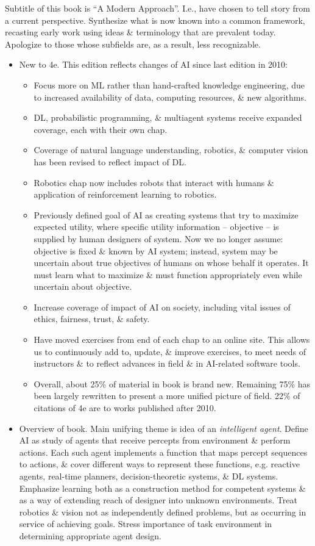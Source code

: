 \documentclass{article}
\begin{document}
\begin{itemize}
	Subtitle of this book is ``A Modern Approach''. I.e., have chosen to tell story from a current perspective. Synthesize what is now known into a common framework, recasting early work using ideas \& terminology that are prevalent today. Apologize to those whose subfields are, as a result, less recognizable.
	\begin{itemize}
		\item {\sf New to 4e.} This edition reflects changes of AI since last edition in 2010:
		\begin{itemize}
			\item Focus more on ML rather than hand-crafted knowledge engineering, due to increased availability of data, computing resources, \& new algorithms.
			\item DL, probabilistic programming, \& multiagent systems receive expanded coverage, each with their own chap.
			\item Coverage of natural language understanding, robotics, \& computer vision has been revised to reflect impact of DL.
			\item Robotics chap now includes robots that interact with humans \& application of reinforcement learning to robotics.
			\item Previously defined goal of AI as creating systems that try to maximize expected utility, where specific utility information -- objective -- is supplied by human designers of system. Now we no longer assume: objective is fixed \& known by AI system; instead, system may be uncertain about true objectives of humans on whose behalf it operates. It must learn what to maximize \& must function appropriately even while uncertain about objective.
			\item Increase coverage of impact of AI on society, including vital issues of ethics, fairness, trust, \& safety.
			\item Have moved exercises from end of each chap to an online site. This allows us to continuously add to, update, \& improve exercises, to meet needs of instructors \& to reflect advances in field \& in AI-related software tools.
			\item Overall, about 25\% of material in book is brand new. Remaining 75\% has been largely rewritten to present a more unified picture of field. 22\% of citations of 4e are to works published after 2010.
		\end{itemize}
		\item {\sf Overview of book.} Main unifying theme is idea of an {\it intelligent agent}. Define AI as study of agents that receive percepts from environment \& perform actions. Each such agent implements a function that maps percept sequences to actions, \& cover different ways to represent these functions, e.g. reactive agents, real-time planners, decision-theoretic systems, \& DL systems. Emphasize learning both as a construction method for competent systems \& as a way of extending reach of designer into unknown environments. Treat robotics \& vision not as independently defined problems, but as occurring in service of achieving goals. Stress importance of task environment in determining appropriate agent design.
		

\end{itemize}
\end{itemize}
\end{document}

